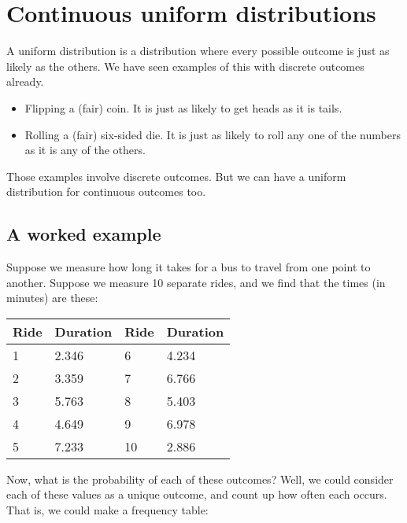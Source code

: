 \documentclass[../../../main.tex]{subfiles}
\begin{document}
\chapter{Continuous uniform distributions}

A uniform distribution is a distribution where every possible outcome is just as likely as the others. We have seen examples of this with discrete outcomes already. 

\begin{itemize}
  \item Flipping a (fair) coin. It is just as likely to get heads as it is tails.
  \item Rolling a (fair) six-sided die. It is just as likely to roll any one of the numbers as it is any of the others.
\end{itemize}

\noindent
Those examples involve discrete outcomes. But we can have a uniform distribution for continuous outcomes too. 


\section{A worked example}

Suppose we measure how long it takes for a bus to travel from one point to another. Suppose we measure 10 separate rides, and we find that the times (in minutes) are these:

\begin{center}
  \begin{tabular}{|| l | l || l | l |}
    \hline
    \textbf{Ride} & \textbf{Duration} & \textbf{Ride} & \textbf{Duration} \\ \hline
    1 & 2.346 & 6 & 4.234 \\ \hline
    2 & 3.359 & 7 & 6.766 \\ \hline
    3 & 5.763 & 8 & 5.403 \\ \hline
    4 & 4.649 & 9 & 6.978 \\ \hline
    5 & 7.233 & 10 & 2.886 \\ \hline
  \end{tabular}
\end{center}

Now, what is the probability of each of these outcomes? Well, we could consider each of these values as a unique outcome, and count up how often each occurs. That is, we could make a frequency table:
\end{document}
